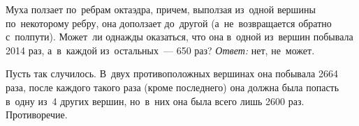 
\problem
\label{2014/ru/pers-combi/senior/1:problem}%
Муха ползает по~ребрам октаэдра, причем, выползая из~одной
вершины по~некоторому ребру, она доползает до~другой (а~не~возвращается обратно
с~полпути).
Может~ли однажды оказаться, что она в~одной из~вершин побывала 2014 раз,
а~в~каждой из~остальных~--- 650 раз?
\solution
\emph{Ответ:} нет, не~может.
\par
Пусть так случилось.
В~двух противоположных вершинах она побывала 2664 раза, после каждого такого
раза (кроме последнего) она должна была попасть в~одну из~4 других вершин,
но~в~них она была всего лишь 2600 раз.
Противоречие.
\endproblem
